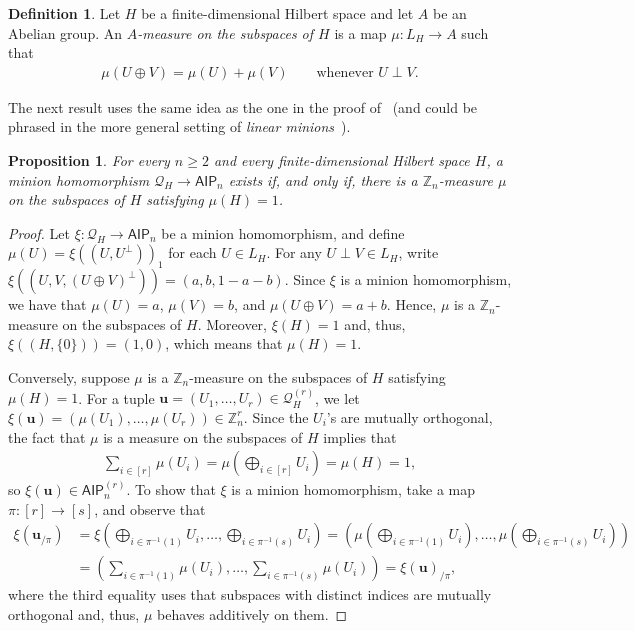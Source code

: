 \documentclass[11pt]{article}
\newcommand{\Z}{\mathbb Z}
\newcommand{\AIP}{\mathsf{AIP}}
\newcommand{\bu}{\mathbf{u}}
\newcommand{\minion}[1]{{\mathcal #1}}
\theoremstyle{plain}
\newtheorem{proposition}[theorem]{Proposition}
\theoremstyle{definition}
\newtheorem{definition}[theorem]{Definition}
\theoremstyle{remark}
\begin{document}
\begin{definition}
Let $H$ be a finite-dimensional Hilbert space and let $A$ be an Abelian group.
An \emph{$A$-measure on the subspaces of $H$} is a
map $\mu:L_H\to A$ such that
\begin{align*}
 \mu(U\oplus V)=\mu(U)+\mu(V)\qquad\text{whenever }U\perp V.
\end{align*}
\end{definition}

The next result uses the same idea as the one in the proof of~\cite[Proposition~15]{ciardo_quantum_minion} (and could be phrased in the more general setting of \textit{linear minions}~\cite{cz23soda:minions}).
\begin{proposition}
\label{prop_measure}
For every $n\geq2$ and every finite-dimensional Hilbert space $H$, a minion homomorphism $\minion Q_H\to\AIP_n$ exists
if, and only if, there is a $\Z_n$-measure $\mu$ on the subspaces of $H$ satisfying
$\mu(H)=1$.
\end{proposition}

\begin{proof}
Let $\xi:\minion Q_H\to\AIP_n$ be a minion homomorphism, and define $\mu(U)=\xi((U,U^\perp))_1$ for each $U\in L_H$. For any $U\perp V\in L_H$, write $\xi((U,V,(U\oplus V)^\perp))=(a,b,1-a-b)$. Since $\xi$ is a minion homomorphism, we have that $\mu(U)=a$, $\mu(V)=b$, and $\mu(U\oplus V)=a+b$. Hence, $\mu$ is a $\Z_n$-measure on the subspaces of $H$. Moreover, $\xi(H)=1$ and, thus, $\xi((H,\{0\}))=(1,0)$, which means that $\mu(H)=1$.

Conversely, suppose $\mu$ is a $\Z_n$-measure  on the subspaces of $H$ satisfying $\mu(H)=1$. For a tuple $\bu=(U_1,\dots,U_r)\in\minion Q_H^{(r)}$, we let $\xi(\bu)=(\mu(U_1),\dots,\mu(U_r))\in\Z_n^r$. Since the $U_i$'s are mutually orthogonal, the fact that $\mu$ is a measure on the subspaces of $H$ implies that 
    \begin{align*}\sum_{i\in[r]}\mu(U_i)=\mu\left(\bigoplus_{i\in[r]}U_i\right)=\mu(H)=1,
    \end{align*}
    so $\xi(\bu)\in\AIP_n^{(r)}$. To show that $\xi$ is a minion homomorphism, take a map $\pi:[r]\to[s]$, and observe that
    \begin{align*}
        \xi(\bu_{/\pi})
        &=
        \xi\left(\bigoplus_{i\in\pi^{-1}(1)}U_i,\dots,\bigoplus_{i\in\pi^{-1}(s)}U_i\right)
        =
        \left(\mu\left(\bigoplus_{i\in\pi^{-1}(1)}U_i\right),\dots,\mu\left(\bigoplus_{i\in\pi^{-1}(s)}U_i\right)\right)\\
        &=\left(\sum_{i\in\pi^{-1}(1)}\mu(U_i),\dots,\sum_{i\in\pi^{-1}(s)}\mu(U_i)\right)
        =
        \xi(\bu)_{/\pi},
    \end{align*}
    where the third equality uses that subspaces with distinct indices are mutually orthogonal and, thus, $\mu$ behaves additively on them. 
\end{proof}
\end{document}
